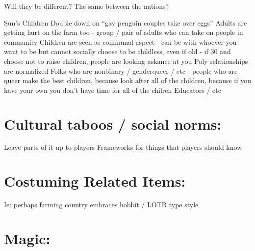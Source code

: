 \documentclass[blue]{GL2020}
\begin{document}
Will they be different? The same between the nations?

Sun’s Children
Double down on “gay penguin couples take over eggs”
Adults are getting hurt on the farm too - group / pair of adults who can take on people in community
Children are seen as communal aspect - can be with whoever you want to be but cannot socially choose to be childless, even if old - if 30 and choose not to raise children, people are looking askance at you
Poly relationships are normalized
Folks who are nonbinary / genderqueer / etc - people who are queer make the best children, because look after all of the children, because if you have your own you don’t have time for all of the chilren
Educators / etc

\section{Cultural taboos / social norms:}

Leave parts of it up to players
Frameworks for things that players should know

\section{Costuming Related Items:}

Ie: perhaps farming country embraces hobbit / LOTR type style

\section{Magic:}
\end{document}
